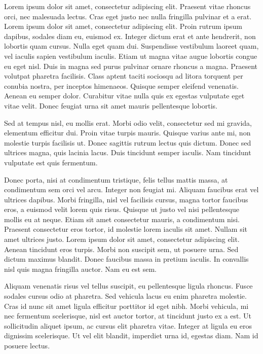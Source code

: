 Lorem ipsum dolor sit amet, consectetur adipiscing elit. Praesent vitae rhoncus orci, nec malesuada lectus. Cras eget justo nec nulla fringilla pulvinar et a erat. Lorem ipsum dolor sit amet, consectetur adipiscing elit. Proin rutrum ipsum dapibus, sodales diam eu, euismod ex. Integer dictum erat et ante hendrerit, non lobortis quam cursus. Nulla eget quam dui. Suspendisse vestibulum laoreet quam, vel iaculis sapien vestibulum iaculis. Etiam ut magna vitae augue lobortis congue eu eget nisl. Duis in magna sed purus pulvinar ornare rhoncus a magna. Praesent volutpat pharetra facilisis. Class aptent taciti sociosqu ad litora torquent per conubia nostra, per inceptos himenaeos. Quisque semper eleifend venenatis. Aenean eu semper dolor. Curabitur vitae nulla quis ex egestas vulputate eget vitae velit. Donec feugiat urna sit amet mauris pellentesque lobortis.

Sed at tempus nisl, eu mollis erat. Morbi odio velit, consectetur sed mi gravida, elementum efficitur dui. Proin vitae turpis mauris. Quisque varius ante mi, non molestie turpis facilisis ut. Donec sagittis rutrum lectus quis dictum. Donec sed ultrices magna, quis lacinia lacus. Duis tincidunt semper iaculis. Nam tincidunt vulputate est quis fermentum.

Donec porta, nisi at condimentum tristique, felis tellus mattis massa, at condimentum sem orci vel arcu. Integer non feugiat mi. Aliquam faucibus erat vel ultrices dapibus. Morbi fringilla, nisl vel facilisis cursus, magna tortor faucibus eros, a euismod velit lorem quis risus. Quisque ut justo vel nisi pellentesque mollis eu at neque. Etiam sit amet consectetur mauris, a condimentum nisi. Praesent consectetur eros tortor, id molestie lorem iaculis sit amet. Nullam sit amet ultrices justo. Lorem ipsum dolor sit amet, consectetur adipiscing elit. Aenean tincidunt eros turpis. Morbi non suscipit sem, ut posuere urna. Sed dictum maximus blandit. Donec faucibus massa in pretium iaculis. In convallis nisl quis magna fringilla auctor. Nam eu est sem.

Aliquam venenatis risus vel tellus suscipit, eu pellentesque ligula rhoncus. Fusce sodales cursus odio at pharetra. Sed vehicula lacus eu enim pharetra molestie. Cras id nunc sit amet ligula efficitur porttitor id eget nibh. Morbi vehicula, mi nec fermentum scelerisque, nisl est auctor tortor, at tincidunt justo ex a est. Ut sollicitudin aliquet ipsum, ac cursus elit pharetra vitae. Integer at ligula eu eros dignissim scelerisque. Ut vel elit blandit, imperdiet urna id, egestas diam. Nam id posuere lectus.
